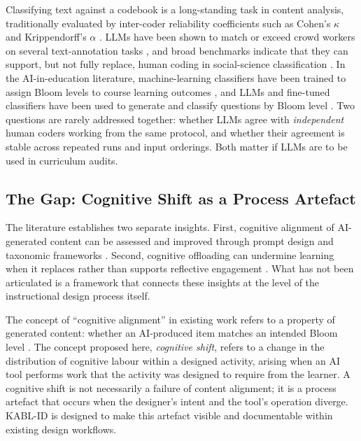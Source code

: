 \documentclass[journal,article,submit,pdftex,moreauthors]{Definitions/mdpi}
\begin{document}
Classifying text against a codebook is a long-standing task in content analysis, traditionally evaluated by inter-coder reliability coefficients such as Cohen's $\kappa$ and Krippendorff's $\alpha$ \cite{cohen_1960, krippendorff_2018, hayes_krippendorff_2007}. LLMs have been shown to match or exceed crowd workers on several text-annotation tasks \cite{gilardi_2023}, and broad benchmarks indicate that they can support, but not fully replace, human coding in social-science classification \cite{ziems_2024}. In the AI-in-education literature, machine-learning classifiers have been trained to assign Bloom levels to course learning outcomes \cite{shaikh_2021}, and LLMs and fine-tuned classifiers have been used to generate and classify questions by Bloom level \cite{yaacoub_oneclickquiz_2025, elkins_2024}. Two questions are rarely addressed together: whether LLMs agree with \emph{independent} human coders working from the same protocol, and whether their agreement is stable across repeated runs and input orderings. Both matter if LLMs are to be used in curriculum audits.

\subsection{The Gap: Cognitive Shift as a Process Artefact}

The literature establishes two separate insights. First, cognitive alignment of AI-generated content can be assessed and improved through prompt design and taxonomic frameworks \cite{yaacoub_oneclickquiz_2025, yaacoub_prompt_2025, ieee_enhancing_2025}. Second, cognitive offloading can undermine learning when it replaces rather than supports reflective engagement \cite{zhai_2024, gerlich_2025, fan_2025}. What has not been articulated is a framework that connects these insights at the level of the instructional design process itself.

The concept of ``cognitive alignment'' in existing work refers to a property of generated content: whether an AI-produced item matches an intended Bloom level \cite{yaacoub_oneclickquiz_2025}. The concept proposed here, \emph{cognitive shift}, refers to a change in the distribution of cognitive labour within a designed activity, arising when an AI tool performs work that the activity was designed to require from the learner. A cognitive shift is not necessarily a failure of content alignment; it is a process artefact that occurs when the designer's intent and the tool's operation diverge. KABL-ID is designed to make this artefact visible and documentable within existing design workflows.
\end{document}
